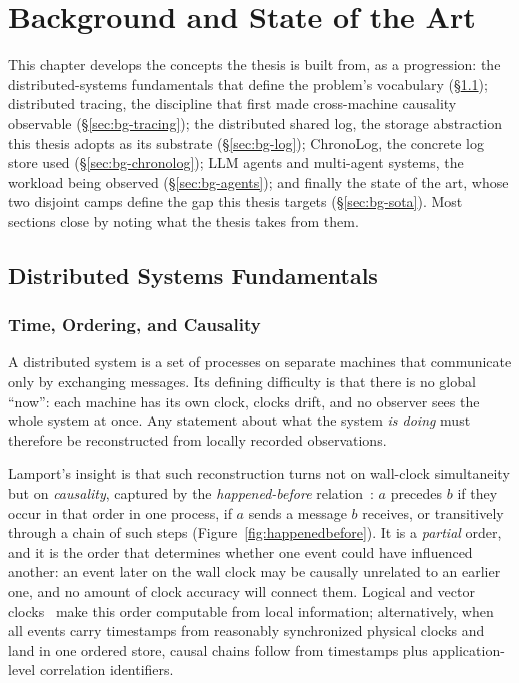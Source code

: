 \chapter{Background and State of the Art}
\label{chap:background}

This chapter develops the concepts the thesis is built from, as a
progression: the distributed-systems fundamentals that define the
problem's vocabulary (\S\ref{sec:bg-ds}); distributed tracing, the discipline
that first made cross-machine causality observable
(\S\ref{sec:bg-tracing}); the distributed shared log, the storage abstraction
this thesis adopts as its substrate (\S\ref{sec:bg-log}); ChronoLog, the
concrete log store used (\S\ref{sec:bg-chronolog}); LLM agents and
multi-agent systems, the workload being observed (\S\ref{sec:bg-agents});
and finally the state of the art, whose two disjoint camps define the gap
this thesis targets (\S\ref{sec:bg-sota}). Most sections close by noting
what the thesis takes from them.

\section{Distributed Systems Fundamentals}
\label{sec:bg-ds}

\subsection{Time, Ordering, and Causality}
\label{sec:bg-time}

A distributed system is a set of processes on separate machines that
communicate only by exchanging messages. Its defining difficulty is that
there is no global ``now'': each machine has its own clock, clocks drift, and
no observer sees the whole system at once. Any statement about what the
system \emph{is doing} must therefore be reconstructed from locally
recorded observations.

Lamport's insight is that such reconstruction turns not on wall-clock
simultaneity but on \emph{causality}, captured by the
\emph{happened-before} relation~\cite{lamport1978time}: $a$ precedes $b$ if
they occur in that order in one process, if $a$ sends a message $b$ receives,
or transitively through a chain of such steps
(Figure~\ref{fig:happenedbefore}). It is a \emph{partial} order, and it is
the order that determines whether one event could have influenced another: an
event later on the wall clock may be causally unrelated to an earlier one,
and no amount of clock accuracy will connect them. Logical and vector
clocks~\cite{lamport1978time,fidge1988timestamps,mattern1989virtual} make
this order computable
from local information; alternatively, when all events carry timestamps from
reasonably synchronized physical clocks and land in one ordered store, causal
chains follow from timestamps plus application-level correlation identifiers.


